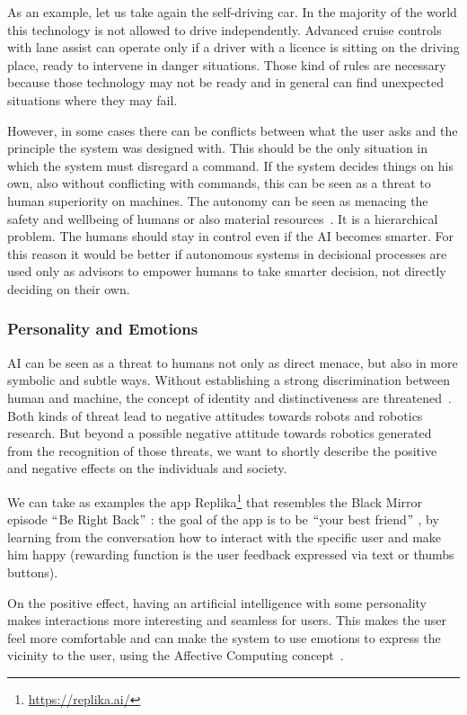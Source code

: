 As an example, let us take again the self-driving car. In the majority of the world this technology is not allowed to drive independently. Advanced cruise controls with lane assist can operate only if a driver with a licence is sitting on the driving place, ready to intervene in danger situations. Those kind of rules are necessary because those technology may not be ready and in general can find unexpected situations where they may fail.

However, in some cases there can be conflicts between what the user asks and the principle the system was designed with. This should be the only situation in which the system must disregard a command. If the system decides things on his own, also without conflicting with commands, this can be seen as a threat to human superiority on machines. The autonomy can be seen as menacing the safety and wellbeing of humans or also material resources~\cite{zlotowski2017can}. It is a hierarchical problem. The humans should stay in control even if the AI becomes smarter. For this reason it would be better if autonomous systems in decisional processes are used only as advisors to empower humans to take smarter decision, not directly deciding on their own.

\subsubsection{Personality and Emotions}
AI can be seen as a threat to humans not only as direct menace, but also in more symbolic and subtle ways. Without establishing a strong discrimination between human and machine, the concept of identity and distinctiveness are threatened~\cite{zlotowski2017can}. Both kinds of threat lead to negative attitudes towards robots and robotics research. But beyond a possible negative attitude towards robotics generated from the recognition of those threats, we want to shortly describe the positive and negative effects on the individuals and society.

We can take as examples the app Replika\footnote{\url{https://replika.ai/}} that resembles the Black Mirror episode $``$Be Right Back$"$ : the goal of the app is to be $``$your best friend$"$ , by learning from the conversation how to interact with the specific user and make him happy (rewarding function is the user feedback expressed via text or thumbs buttons).

On the positive effect, having an artificial intelligence with some personality makes interactions more interesting and seamless for users. This makes the user feel more comfortable and can make the system to use emotions to express the vicinity to the user, using the Affective Computing concept~\cite{picard2000affective}.

